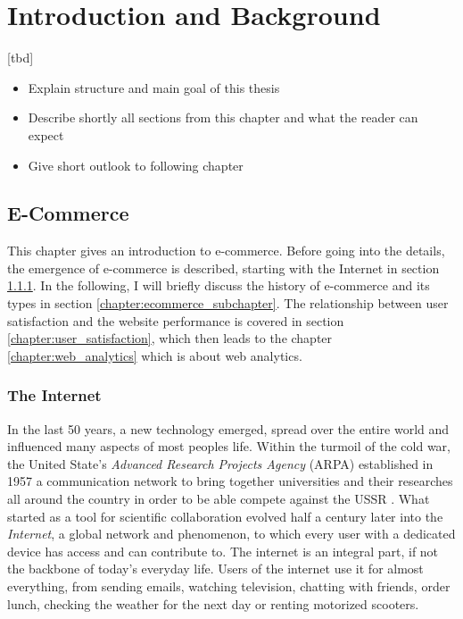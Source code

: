 \chapter{Introduction and Background}

[tbd]

\begin{itemize}
	\item Explain structure and main goal of this thesis
	\item Describe shortly all sections from this chapter and what the reader can expect
	\item Give short outlook to following chapter
\end{itemize}






\section{E-Commerce}
\label{chapter:e-commerce}

This chapter gives an introduction to e-commerce.
Before going into the details, the emergence of e-commerce is described, starting with the Internet in section \ref{chapter:internet}.
In the following, I will briefly discuss the history of e-commerce and its types in section \ref{chapter:ecommerce_subchapter}.
The relationship between user satisfaction and the website performance is covered in section \ref{chapter:user_satisfaction}, which then leads to the chapter \ref{chapter:web_analytics} which is about web analytics.



\subsection{The Internet}
\label{chapter:internet}

In the last 50 years, a new technology emerged, spread over the entire world and influenced many aspects of most peoples life.
Within the turmoil of the cold war, the United State's \textit{Advanced Research Projects Agency} (ARPA) established in 1957 a communication network to bring together universities and their researches all around the country in order to be able compete against the USSR \cite{2011Cohen}.
What started as a tool for scientific collaboration evolved half a century later into the \textit{Internet}, a global network and phenomenon, to which every user with a dedicated device has access and can contribute to.
The internet is an integral part, if not the backbone of today's everyday life.
Users of the internet use it for almost everything, from sending emails, watching television, chatting with friends,  order lunch, checking the weather for the next day or renting motorized scooters.

